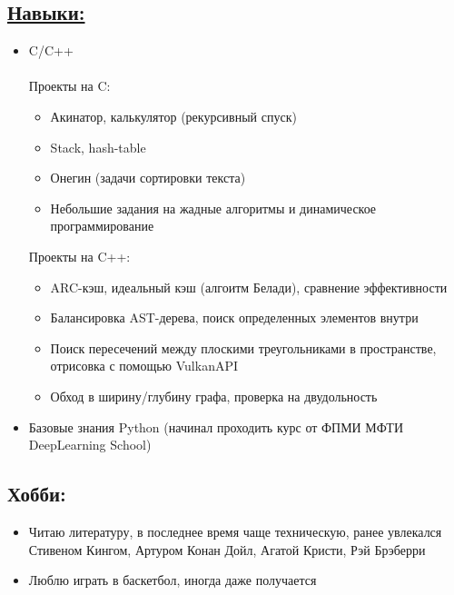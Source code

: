 \documentclass[a4paper, 12pt]{article}
\begin{document}
\subsection*{\underline{Навыки:}}
\begin{itemize}
    \item C/C++ \\\\
    Проекты на C:
    \begin{itemize}
        \item Акинатор, калькулятор (рекурсивный спуск)
        \item Stack, hash-table
        \item Онегин (задачи сортировки текста)
        \item Небольшие задания на жадные алгоритмы и динамическое программирование
    \end{itemize}
    Проекты на C++:
    \begin{itemize}
        \item ARC-кэш, идеальный кэш (алгоитм Белади), сравнение эффективности
        \item Балансировка AST-дерева, поиск определенных элементов внутри
        \item Поиск пересечений между плоскими треугольниками в пространстве, отрисовка с помощью VulkanAPI
        \item Обход в ширину/глубину графа, проверка на двудольность
    \end{itemize}

    \item Базовые знания Python (начинал проходить курс от ФПМИ МФТИ DeepLearning School)
\end{itemize}

\subsection*{Хобби:}
\begin{itemize}
    \item Читаю литературу, в последнее время чаще техническую, ранее увлекался Стивеном Кингом, Артуром Конан Дойл, Агатой Кристи, Рэй Брэберри
    \item Люблю играть в баскетбол, иногда даже получается
\end{itemize}
\end{document}

